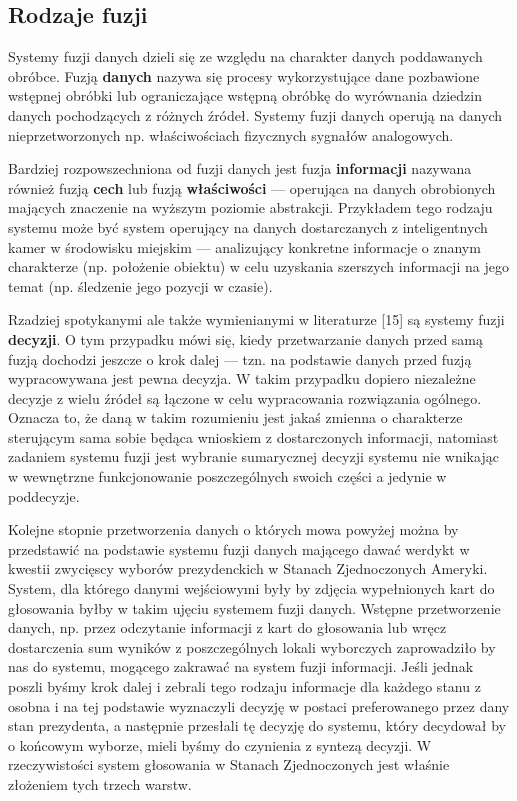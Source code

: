 \subsection{Rodzaje fuzji}
\par{
Systemy fuzji danych dzieli się ze względu na charakter danych poddawanych obróbce. Fuzją \textbf{danych} nazywa się procesy wykorzystujące dane pozbawione wstępnej obróbki lub ograniczające wstępną obróbkę do wyrównania dziedzin danych pochodzących z różnych źródeł. Systemy fuzji danych operują na danych nieprzetworzonych np. właściwościach fizycznych sygnałów analogowych.
}
\par{
Bardziej rozpowszechniona od fuzji danych jest fuzja \textbf{informacji} nazywana również fuzją \textbf{cech} lub fuzją \textbf{właściwości} --- operująca na danych obrobionych mających znaczenie na wyższym poziomie abstrakcji. Przykładem tego rodzaju systemu może być system operujący na danych dostarczanych z inteligentnych kamer w środowisku miejskim --- analizujący konkretne informacje o znanym charakterze (np. położenie obiektu) w celu uzyskania szerszych informacji na jego temat (np. śledzenie jego pozycji w czasie).
}
\par{
Rzadziej spotykanymi ale także wymienianymi w literaturze [15] są systemy fuzji \textbf{decyzji}. O tym przypadku mówi się, kiedy przetwarzanie danych przed samą fuzją dochodzi jeszcze o krok dalej --- tzn. na podstawie danych przed fuzją wypracowywana jest pewna decyzja. W takim przypadku dopiero niezależne decyzje z wielu źródeł są łączone w celu wypracowania rozwiązania ogólnego. Oznacza to, że daną w takim rozumieniu jest jakaś zmienna o charakterze sterującym sama sobie będąca wnioskiem z dostarczonych informacji, natomiast zadaniem systemu fuzji jest wybranie sumarycznej decyzji systemu nie wnikając w wewnętrzne funkcjonowanie poszczególnych swoich części a jedynie w poddecyzje.
}
\par{
Kolejne stopnie przetworzenia danych o których mowa powyżej można by przedstawić na podstawie systemu fuzji danych mającego dawać werdykt w kwestii zwycięscy wyborów prezydenckich w Stanach Zjednoczonych Ameryki. System, dla którego danymi wejściowymi były by zdjęcia wypełnionych kart do głosowania byłby w takim ujęciu systemem fuzji danych. Wstępne przetworzenie danych, np. przez odczytanie informacji z kart do głosowania lub wręcz dostarczenia sum wyników z poszczególnych lokali wyborczych zaprowadziło by nas do systemu, mogącego zakrawać na system fuzji informacji. Jeśli jednak poszli byśmy krok dalej i zebrali tego rodzaju informacje dla każdego stanu z osobna i na tej podstawie wyznaczyli decyzję w postaci preferowanego przez dany stan prezydenta, a następnie przesłali tę decyzję do systemu, który decydował by o końcowym wyborze, mieli byśmy do czynienia z syntezą decyzji. W rzeczywistości system głosowania w Stanach Zjednoczonych jest właśnie złożeniem tych trzech warstw.
}
